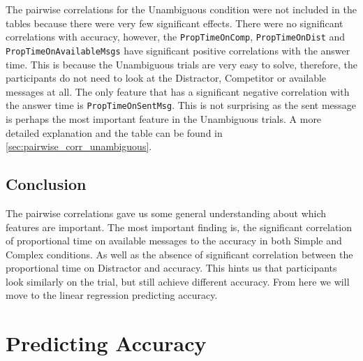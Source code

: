\sloppy
The pairwise correlations for the Unambiguous condition were not included in the tables because there were very few significant effects. There were no significant correlations with accuracy, however, the \texttt{PropTimeOnComp}, \texttt{PropTimeOnDist} and \texttt{PropTimeOnAvailableMsgs} have significant positive correlations with the answer time. This is because the Unambiguous trials are very easy to solve, therefore, the participants do not need to look at the Distractor, Competitor or available messages at all. The only feature that has a significant negative correlation with the answer time is \texttt{PropTimeOnSentMsg}. This is not surprising as the sent message is perhaps the most important feature in the Unambiguous trials. A more detailed explanation and the table can be found in \autoref{sec:pairwise_corr_unambiguous}.
\sloppy

\subsection*{Conclusion}
The pairwise correlations gave us some general understanding about which features are important. The most important finding is, the significant correlation of proportional time on available messages to the accuracy in both Simple and Complex conditions. As well as the absence of significant correlation between the proportional time on Distractor and accuracy. This hints us that participants look similarly on the trial, but still achieve different accuracy. From here we will move to the linear regression predicting accuracy. 















\section{Predicting Accuracy}
\label{sec:accuracy_model}

